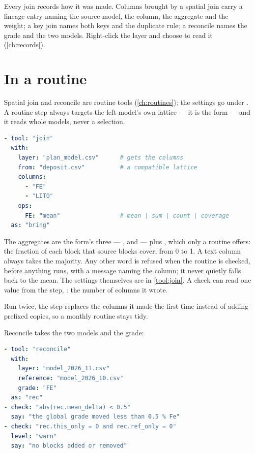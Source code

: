 \begin{note}
Every join records how it was made. Columns brought by a spatial join carry a lineage entry naming the source model, the column, the aggregate and the weight; a key join names both keys and the duplicate rule; a reconcile names the grade and the two models. Right-click the layer and choose  to read it (\cref{ch:records}).
\end{note}

\section{In a routine}\label{sec:joins-routine}

Spatial join and reconcile are routine tools (\cref{ch:routines}); the settings go under . A routine step always targets the left model's own lattice — it is the  form — and it reads whole models, never a selection.

\begin{lstlisting}[language=yaml]
- tool: "join"
  with:
    layer: "plan_model.csv"      # gets the columns
    from: "deposit.csv"          # a compatible lattice
    columns:
      - "FE"
      - "LITO"
    ops:
      FE: "mean"                 # mean | sum | count | coverage
  as: "bring"
\end{lstlisting}
The aggregates are the form's three — ,  and  — plus , which only a routine offers: the fraction of each block that source blocks cover, from 0 to 1. A text column always takes the majority. Any other word is refused when the routine is checked, before anything runs, with a message naming the column; it never quietly falls back to the mean. The settings themselves are in \cref{tool:join}. A check can read one value from the step, : the number of columns it wrote.

Run twice, the step replaces the columns it made the first time instead of adding prefixed copies, so a monthly routine stays tidy.

Reconcile takes the two models and the grade:

\begin{lstlisting}[language=yaml]
- tool: "reconcile"
  with:
    layer: "model_2026_11.csv"
    reference: "model_2026_10.csv"
    grade: "FE"
  as: "rec"
- check: "abs(rec.mean_delta) < 0.5"
  say: "the global grade moved less than 0.5 % Fe"
- check: "rec.this_only = 0 and rec.ref_only = 0"
  level: "warn"
  say: "no blocks added or removed"
\end{lstlisting}

